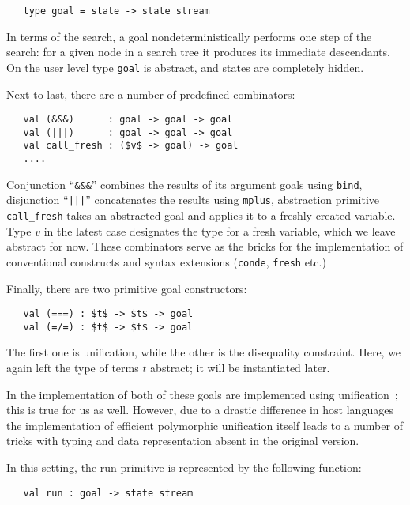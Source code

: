 \begin{lstlisting}
   type goal = state -> state stream
\end{lstlisting}

In terms of the search, a goal nondeterministically performs one step of the search: for a given
node in a search tree it produces its immediate descendants. On the user level type \lstinline{goal}
is abstract, and states are completely hidden.

Next to last, there are a number of predefined combinators:

\begin{lstlisting}
   val (&&&)      : goal -> goal -> goal
   val (|||)      : goal -> goal -> goal
   val call_fresh : ($v$ -> goal) -> goal
   ....
\end{lstlisting}

Conjunction ``\lstinline{&&&}'' combines the results of its argument goals using \lstinline{bind},
disjunction ``\lstinline{|||}'' concatenates the results using \lstinline{mplus}, abstraction
primitive \lstinline{call_fresh} takes an abstracted goal and applies it to a freshly created
variable. Type $v$ in the latest case designates the type for a fresh variable, which we leave
abstract for now. These combinators serve as the bricks for the implementation of conventional
\miniKanren constructs and syntax extensions (\lstinline{conde}, \lstinline{fresh} etc.)

Finally, there are two primitive goal constructors:

\begin{lstlisting}
   val (===) : $t$ -> $t$ -> goal
   val (=/=) : $t$ -> $t$ -> goal
\end{lstlisting}

The first one is unification, while the other is the disequality constraint. Here, we again left
the type of terms $t$ abstract; it will be instantiated later.

In the implementation of \miniKanren both of these goals are implemented using unification~\cite{CKanren}; this
is true for us as well. However, due to a drastic difference in host languages the implementation of
efficient polymorphic unification itself leads to a number of tricks with typing and data representation
absent in the original version.

In this setting, the run primitive is represented by the following function:

\begin{lstlisting}
   val run : goal -> state stream
\end{lstlisting}

